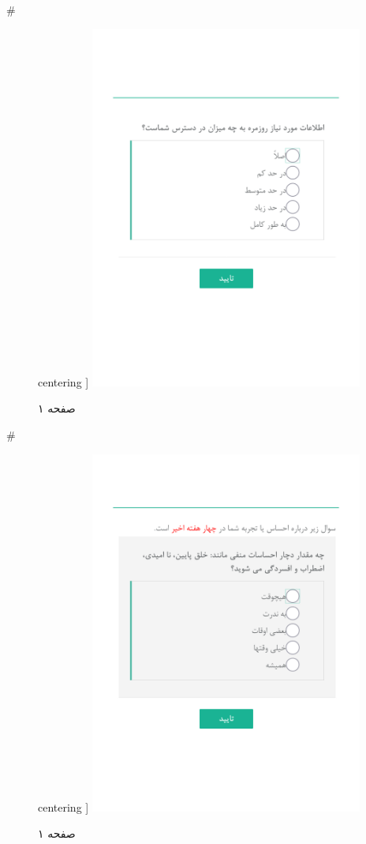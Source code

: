 { 
 # 
\begin{figure}[htpb]
centering ]
\includegraphics[width=0.8\textwidth]{./img/Task18.png/}
\caption{صفحه ۱}
\label{fig:Task1}
\end{figure}
 
 
 # 
\begin{figure}[htpb]
centering ]
\includegraphics[width=0.8\textwidth]{./img/Task19.png/}
\caption{صفحه ۱}
\label{fig:Task1}
\end{figure}
 
}
